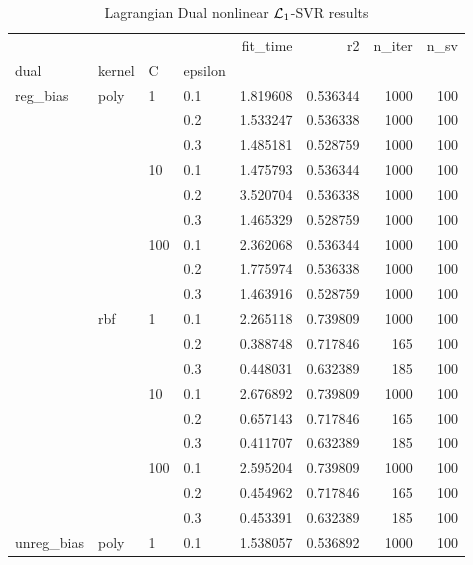 \begin{table}[H]
\centering
\caption{Lagrangian Dual nonlinear $\protect \mathcal{L}_1$-SVR results}
\label{nonlinear_lagrangian_dual_l1_svr_cv_results}
\begin{tabular}{llllrrrr}
\toprule
           &     &     &     &  fit\_time &        r2 &  n\_iter &  n\_sv \\
dual & kernel & C & epsilon &           &           &         &       \\
\midrule
reg\_bias & poly & 1   & 0.1 &  1.819608 &  0.536344 &    1000 &   100 \\
           &     &     & 0.2 &  1.533247 &  0.536338 &    1000 &   100 \\
           &     &     & 0.3 &  1.485181 &  0.528759 &    1000 &   100 \\
           &     & 10  & 0.1 &  1.475793 &  0.536344 &    1000 &   100 \\
           &     &     & 0.2 &  3.520704 &  0.536338 &    1000 &   100 \\
           &     &     & 0.3 &  1.465329 &  0.528759 &    1000 &   100 \\
           &     & 100 & 0.1 &  2.362068 &  0.536344 &    1000 &   100 \\
           &     &     & 0.2 &  1.775974 &  0.536338 &    1000 &   100 \\
           &     &     & 0.3 &  1.463916 &  0.528759 &    1000 &   100 \\
           & rbf & 1   & 0.1 &  2.265118 &  0.739809 &    1000 &   100 \\
           &     &     & 0.2 &  0.388748 &  0.717846 &     165 &   100 \\
           &     &     & 0.3 &  0.448031 &  0.632389 &     185 &   100 \\
           &     & 10  & 0.1 &  2.676892 &  0.739809 &    1000 &   100 \\
           &     &     & 0.2 &  0.657143 &  0.717846 &     165 &   100 \\
           &     &     & 0.3 &  0.411707 &  0.632389 &     185 &   100 \\
           &     & 100 & 0.1 &  2.595204 &  0.739809 &    1000 &   100 \\
           &     &     & 0.2 &  0.454962 &  0.717846 &     165 &   100 \\
           &     &     & 0.3 &  0.453391 &  0.632389 &     185 &   100 \\
unreg\_bias & poly & 1   & 0.1 &  1.538057 &  0.536892 &    1000 &   100 \\

\end{tabular}
\end{table}
